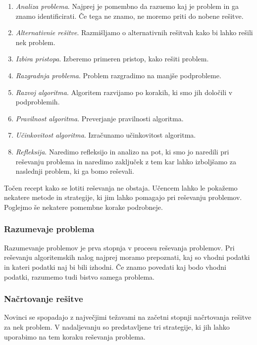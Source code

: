 \begin{enumerate}
\tightlist
\item \emph{Analiza problema}. Najprej je pomembno da razuemo kaj je
  problem in ga znamo identificirati. Če tega ne znamo, ne moremo
  priti do nobene rešitve.
\item \emph{Alternativnie rešitve}. Razmišljamo o alternativnih
  rešitvah kako bi lahko rešili nek problem.
\item \emph{Izbira pristopa}. Izberemo primeren pristop, kako rešiti problem.
\item \emph{Razgradnja problema}. Problem razgradimo na manjše podprobleme.
\item \emph{Razvoj algoritma}. Algoritem razvijamo po korakih, ki smo
  jih določili v podproblemih.
\item \emph{Pravilnost algoritma}. Preverjanje pravilnosti algoritma.
\item \emph{Učinkovitost algoritma}. Izračunamo učinkovitost algoritma.
\item \emph{Refleksija}. Naredimo refleksijo in analizo na pot, ki smo
  jo naredili pri reševanju problema in naredimo zaključek z tem kar
  lahko izboljšamo za naslednji problem, ki ga bomo reševali.
\end{enumerate}

Točen recept kako se lotiti reševanja ne obstaja. Učencem lahko le
pokažemo nekatere metode in strategije, ki jim lahko pomagajo pri
reševanju problemov. Poglejmo še nekatere pomembne korake podrobneje.

\subsubsection{Razumevaje problema}
\label{sec:razumevanje problema}

Razumevanje problemov je prva stopnja v procesu reševanja
problemov. Pri reševanju algoritemskih nalog najprej moramo
prepoznati, kaj so vhodni podatki in kateri podatki naj bi bili
izhodni. Če znamo povedati kaj bodo vhodni podatki, razumemo tudi
bistvo samega problema.

\subsubsection{Načrtovanje rešitve}
\label{sec:načrtovanje_rešitve}

Novinci se spopadajo z največjimi težavami na začetni stopnji
načrtovanja rešitve za nek problem. V nadaljevanju so predstavljene
tri strategije, ki jih lahko uporabimo na tem koraku reševanja
problema.

